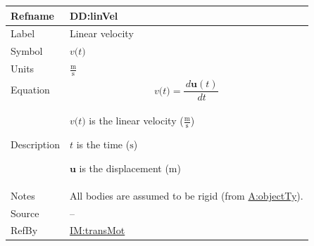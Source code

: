 \documentclass[12pt]{article}
\begin{document}
\vspace{\baselineskip}
\noindent
\begin{minipage}{\textwidth}
\begin{tabular}{>{\raggedright}p{}>{\raggedright\arraybackslash}p{}}
\toprule \textbf{Refname} & \textbf{DD:linVel}
\label{DD:linVel}
\\ \midrule
Label & Linear velocity
        
\\ \midrule
Symbol & $v\text{(}t\text{)}$
         
\\ \midrule
Units & $\frac{\text{m}}{\text{s}}$
        
\\ \midrule
Equation & \begin{displaymath}
           v\text{(}t\text{)}=\frac{\,d\symbf{u}\left(t\right)}{\,dt}
           \end{displaymath}
\\ \midrule
Description & \begin{symbDescription}
              \item{$v\text{(}t\text{)}$ is the linear velocity ($\frac{\text{m}}{\text{s}}$)}
              \item{$t$ is the time (${\text{s}}$)}
              \item{$\symbf{u}$ is the displacement (${\text{m}}$)}
              \end{symbDescription}
\\ \midrule
Notes & All bodies are assumed to be rigid (from \hyperref[assumpOT]{A:objectTy}).
        
\\ \midrule
Source & --
         
\\ \midrule
RefBy & \hyperref[IM:transMot]{IM:transMot}
        
\\ \bottomrule
\end{tabular}
\end{minipage}
\end{document}
